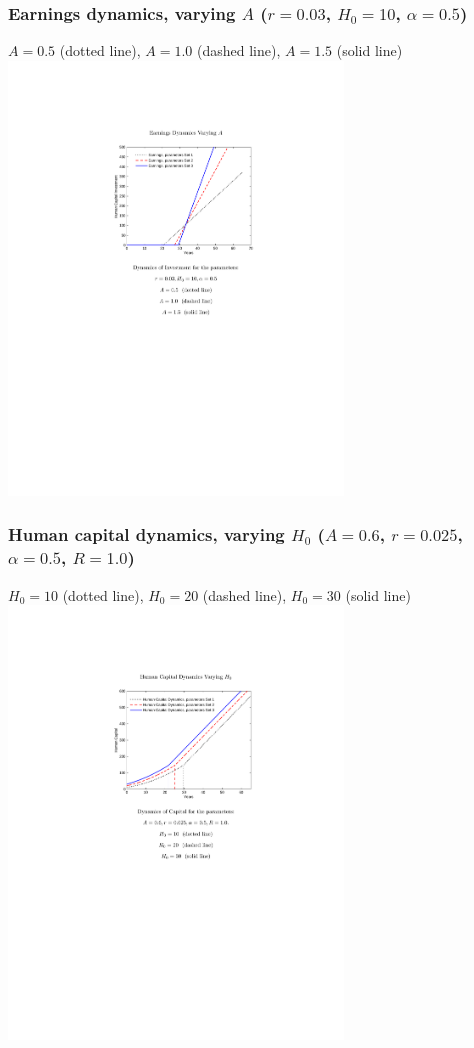 \documentclass[12pt,compress,handout]{beamer}  %
\begin{document}
\begin{frame}
\frametitle{Earnings dynamics, varying $A$ ($r=0.03$, $H_{0}=10$,
$\alpha=0.5$)}
\begin{center}
{\footnotesize $A =0.5$ (dotted line), $A =1.0$ (dashed line), $A
=1.5$ (solid line)}
\includegraphics[width=3.5in]{include/fig-hc-earn-series-09.pdf}
\end{center}
\end{frame}


\begin{frame}
\frametitle{Human capital dynamics, varying $H_{0}$ ($A=0.6$,
$r=0.025$, $\alpha = 0.5$, $R=1.0$)}
\begin{center}
{\footnotesize $H_{0} = 10$ (dotted line), $H_{0} = 20$ (dashed
line), $H_{0} = 30$ (solid line)}
\includegraphics[width=3.5in]{include/fig-hc-earn-series-10.pdf}
\end{center}
\end{frame}
\end{document}
